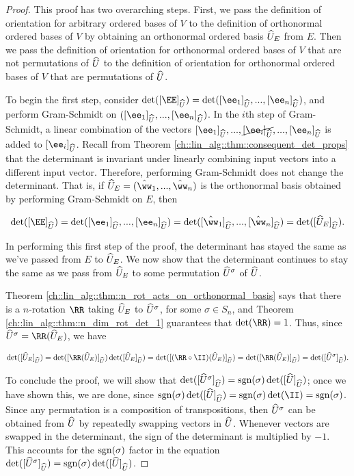 \begin{proof}
   This proof has two overarching steps. First, we pass the definition of orientation for arbitrary ordered bases of $V$ to the definition of orthonormal ordered bases of $V$ by obtaining an orthonormal ordered basis $\widehat{U}_E$ from $E$. Then we pass the definition of orientation for orthonormal ordered bases of $V$ that are not permutations of $\widehat{U}$ to the definition of orientation for orthonormal ordered bases of $V$ that are permutations of $\widehat{U}$.
   
   To begin the first step, consider $\det([\EE]_{\hU}) = \det([\ee_1]_{\hU}, ..., [\ee_n]_{\hU})$, and perform Gram-Schmidt on $([\ee_1]_{\hU}, ..., [\ee_n]_{\hU})$. In the $i$th step of Gram-Schmidt, a linear combination of the vectors $[\ee_1]_{\hU}, ..., \cancel{[\ee_i]_{\hU}}, ..., [\ee_n]_{\hU}$ is added to $[\ee_i]_{\hU}$. Recall from Theorem \ref{ch::lin_alg::thm::consequent_det_props} that the determinant is invariant under linearly combining input vectors into a different input vector. Therefore, performing Gram-Schmidt does not change the determinant. That is, if $\hU_E = (\hww_1, ..., \hww_n)$ is the orthonormal basis obtained by performing Gram-Schmidt on $E$, then 
   
   \begin{align*}
       \det([\EE]_{\hU}) = \det([\ee_1]_{\hU}, ..., [\ee_n]_{\hU}) = \det([\hww_1]_{\hU}, ..., [\hww_n]_{\hU})
       =
       \det([\hU_E]_{\hU}).
   \end{align*}
   
   In performing this first step of the proof, the determinant has stayed the same as we've passed from $E$ to $\widehat{U}_E$. We now show that the determinant continues to stay the same as we pass from  $\widehat{U}_E$ to some permutation $\widehat{U}^\sigma$ of $\widehat{U}$.
   
   Theorem \ref{ch::lin_alg::thm::n_rot_acts_on_orthonormal_basis} says that there is a $n$-rotation $\RR$ taking $\widehat{U}_E$ to $\widehat{U}^\sigma$, for some $\sigma \in S_n$, and Theorem \ref{ch::lin_alg::thm::n_dim_rot_det_1} guarantees that $\det(\RR) = 1$. Thus, since $\hU^\sigma = \RR(\hU_E)$, we have
   
   \begin{align*}
        \det([\hU_E]_{\hU}) 
        = \det([\RR(\hU_E)]_{\hU}) \det([\hU_E]_{\hU})
        = \det([(\RR \circ \II)(\hU_E)]_{\hU})
        = \det([\RR(\hU_E)]_{\hU})
        = \det([\hU^\sigma]_{\hU}).
   \end{align*}
   
   To conclude the proof, we will show that $\det([\widehat{U}^\sigma]_{\widehat{U}}) = \text{sgn}(\sigma) \det([\widehat{U}]_{\widehat{U}})$; once we have shown this, we are done, since $\sgn(\sigma) \det([\hU]_{\hU}) = \sgn(\sigma) \det(\II) = \sgn(\sigma)$. Since any permutation is a composition of transpositions, then $\widehat{U}^\sigma$ can be obtained from $\widehat{U}$ by repeatedly swapping vectors in $\widehat{U}$. Whenever vectors are swapped in the determinant, the sign of the determinant is multiplied by $-1$. This accounts for the $\text{sgn}(\sigma)$ factor in the equation $\det([\widehat{U}^\sigma]_{\widehat{U}}) = \text{sgn}(\sigma) \det([\widehat{U}]_{\widehat{U}})$.
\end{proof}


